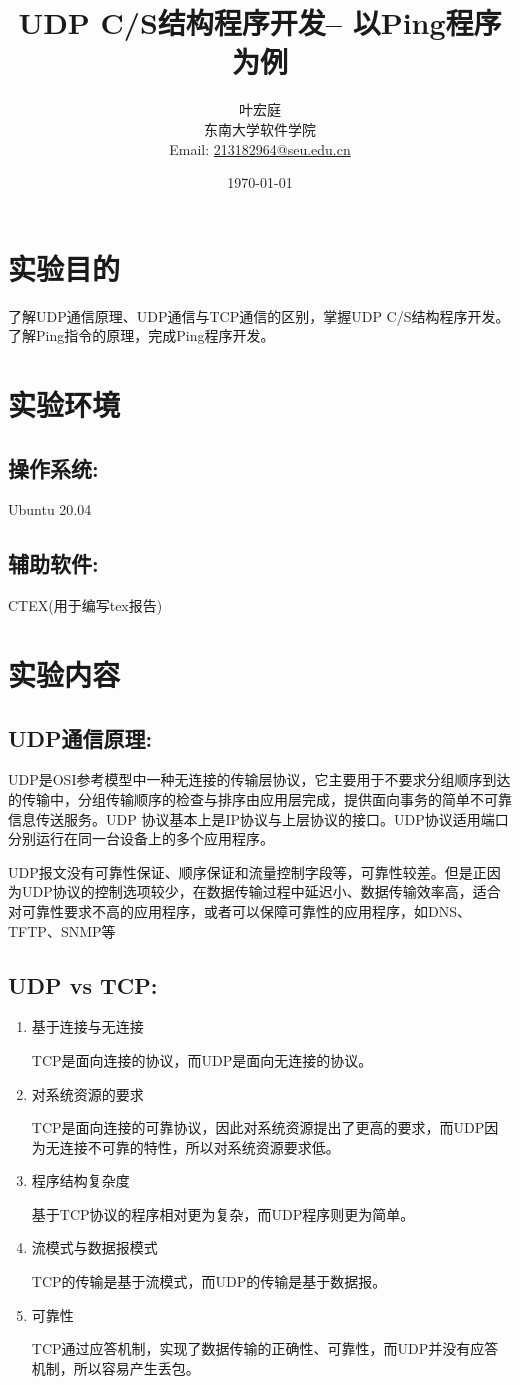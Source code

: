 \documentclass[UTF8]{ctexart}
\author{\small{\kaishu 71118415 叶宏庭}\\[2pt]
\small{\kaishu 东南大学软件学院}\\[2pt]
\small{Email:}
\url{213182964@seu.edu.cn}
}
\title{\Huge{\heiti UDP C/S结构程序开发-- 以Ping程序为例}}
\date{\today} %
\begin{document}
\maketitle

\section{实验目的}{了解UDP通信原理、UDP通信与TCP通信的区别，掌握UDP C/S结构程序开发。了解Ping指令的原理，完成Ping程序开发。}

\section{实验环境}
\subsection{操作系统:}{Ubuntu 20.04}
\subsection{辅助软件:}{CTEX(用于编写tex报告)}
\section{实验内容}
\subsection{UDP通信原理:}{UDP是OSI参考模型中一种无连接的传输层协议，它主要用于不要求分组顺序到达的传输中，分组传输顺序的检查与排序由应用层完成，提供面向事务的简单不可靠信息传送服务。UDP 协议基本上是IP协议与上层协议的接口。UDP协议适用端口分别运行在同一台设备上的多个应用程序。}
\par{UDP报文没有可靠性保证、顺序保证和流量控制字段等，可靠性较差。但是正因为UDP协议的控制选项较少，在数据传输过程中延迟小、数据传输效率高，适合对可靠性要求不高的应用程序，或者可以保障可靠性的应用程序，如DNS、TFTP、SNMP等}
\subsection{UDP vs TCP:}{
\begin{enumerate}
\item 基于连接与无连接
\par{TCP是面向连接的协议，而UDP是面向无连接的协议。}
\item 对系统资源的要求
\par{TCP是面向连接的可靠协议，因此对系统资源提出了更高的要求，而UDP因为无连接不可靠的特性，所以对系统资源要求低。}
\item 程序结构复杂度
\par{基于TCP协议的程序相对更为复杂，而UDP程序则更为简单。}
\item 流模式与数据报模式
\par{TCP的传输是基于流模式，而UDP的传输是基于数据报。}
\item 可靠性
\par{TCP通过应答机制，实现了数据传输的正确性、可靠性，而UDP并没有应答机制，所以容易产生丢包。}
\end{enumerate}
}
\end{document}
